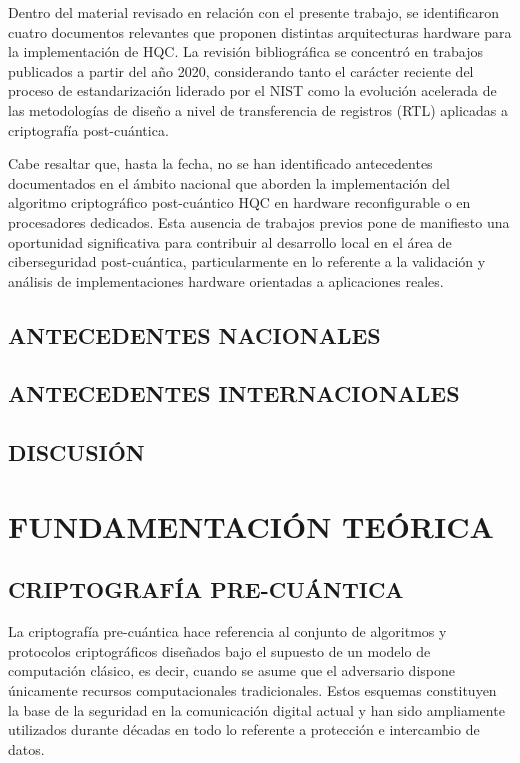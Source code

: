 Dentro del material revisado en relación con el presente trabajo, se identificaron cuatro documentos relevantes que proponen distintas arquitecturas hardware para la implementación de HQC. La revisión bibliográfica se concentró en trabajos publicados a partir del año 2020, considerando tanto el carácter reciente del proceso de estandarización liderado por el NIST como la evolución acelerada de las metodologías de diseño a nivel de transferencia de registros (RTL) aplicadas a criptografía post-cuántica.

Cabe resaltar que, hasta la fecha, no se han identificado antecedentes documentados en el ámbito nacional que aborden la implementación del algoritmo criptográfico post-cuántico HQC en hardware reconfigurable o en procesadores dedicados. Esta ausencia de trabajos previos pone de manifiesto una oportunidad significativa para contribuir al desarrollo local en el área de ciberseguridad post-cuántica, particularmente en lo referente a la validación y análisis de implementaciones hardware orientadas a aplicaciones reales.

\section{ANTECEDENTES NACIONALES}


\section{ANTECEDENTES INTERNACIONALES}


\section{DISCUSIÓN}



\chapter{FUNDAMENTACIÓN TEÓRICA}
\section{CRIPTOGRAFÍA PRE-CUÁNTICA}
La criptografía pre-cuántica hace referencia al conjunto de algoritmos y protocolos criptográficos diseñados bajo el supuesto de un modelo de computación clásico, es decir, cuando se asume que el adversario dispone únicamente recursos computacionales tradicionales. Estos esquemas constituyen la base de la seguridad en la comunicación digital actual y han sido ampliamente utilizados durante décadas en todo lo referente a protección e intercambio  de datos.

